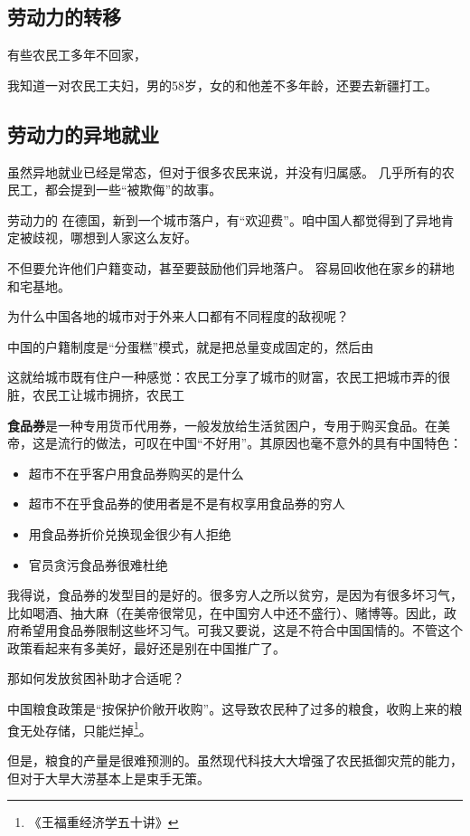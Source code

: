 \subsection{劳动力的转移}
有些农民工多年不回家，

我知道一对农民工夫妇，男的58岁，女的和他差不多年龄，还要去新疆打工。

\subsection{劳动力的异地就业}

虽然异地就业已经是常态，但对于很多农民来说，并没有归属感。
几乎所有的农民工，都会提到一些“被欺侮”的故事。

劳动力的
在德国，新到一个城市落户，有“欢迎费”。咱中国人都觉得到了异地肯定被歧视，哪想到人家这么友好。

不但要允许他们户籍变动，甚至要鼓励他们异地落户。
容易回收他在家乡的耕地和宅基地。

为什么中国各地的城市对于外来人口都有不同程度的敌视呢？

中国的户籍制度是“分蛋糕”模式，就是把总量变成固定的，然后由

这就给城市既有住户一种感觉：农民工分享了城市的财富，农民工把城市弄的很脏，农民工让城市拥挤，农民工

\textbf{食品券}是一种专用货币代用券，一般发放给生活贫困户，专用于购买食品。在美帝，这是流行的做法，可叹在中国“不好用”。其原因也毫不意外的具有中国特色：
\begin{itemize}
\item 超市不在乎客户用食品券购买的是什么
\item 超市不在乎食品券的使用者是不是有权享用食品券的穷人
\item 用食品券折价兑换现金很少有人拒绝
\item 官员贪污食品券很难杜绝
\end{itemize}

我得说，食品券的发型目的是好的。很多穷人之所以贫穷，是因为有很多坏习气，比如喝酒、抽大麻（在美帝很常见，在中国穷人中还不盛行）、赌博等。因此，政府希望用食品券限制这些坏习气。可我又要说，这是不符合中国国情的。不管这个政策看起来有多美好，最好还是别在中国推广了。

那如何发放贫困补助才合适呢？



中国粮食政策是“按保护价敞开收购”。这导致农民种了过多的粮食，收购上来的粮食无处存储，只能烂掉\footnote{《王福重经济学五十讲》}。

但是，粮食的产量是很难预测的。虽然现代科技大大增强了农民抵御灾荒的能力，但对于大旱大涝基本上是束手无策。

